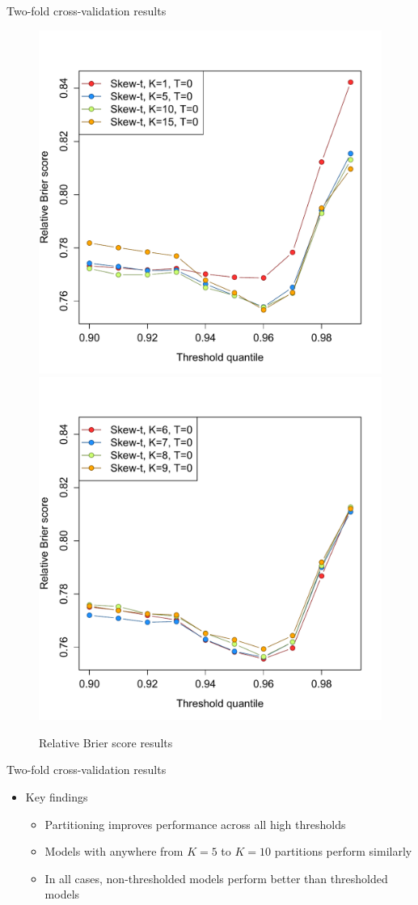 \documentclass{beamer}
\begin{document}
\begin{frame}{Two-fold cross-validation results}
  \centering
  \begin{figure}
    \includegraphics[width=0.47\linewidth]{./plots/pot/bs-ozone-1.pdf}
    \includegraphics[width=0.47\linewidth]{./plots/pot/bs-ozone-2.pdf} \\
    \caption{Relative Brier score results}
  \end{figure}
\end{frame}

\begin{frame}{Two-fold cross-validation results}
  \begin{itemize} \setlength{\itemsep}{0.5em}
    \item Key findings
    \begin{itemize}
      \item Partitioning improves performance across all high thresholds
      \item Models with anywhere from $K = 5$ to $K = 10$ partitions perform similarly
      \item In all cases, non-thresholded models perform better than thresholded models
    \end{itemize}
  \end{itemize}
\end{frame}
\end{document}
